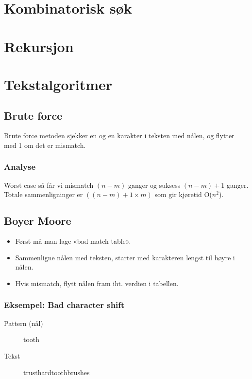 \documentclass[11pt,a4paper]{article}
\theoremstyle{def}
\begin{document}
\section{Kombinatorisk søk}
\section{Rekursjon}

\section{Tekstalgoritmer}

\subsection{Brute force}
Brute force metoden sjekker en og en karakter i teksten med nålen, og flytter med 1 om det er mismatch.

\subsubsection{Analyse}
Worst case så får vi mismatch $(n-m)$ ganger og suksess $(n-m)+1$ ganger. Totale sammenligninger er $((n-m)+1 \times m)$ som gir kjøretid O($n^2$).

\subsection{Boyer Moore}
\begin{itemize}
\item
Først må man lage «bad match table».
\item
Sammenligne nålen med teksten, starter med karakteren lengst til høyre i nålen.
\item
Hvis mismatch, flytt nålen fram iht. verdien i tabellen.
\end{itemize}

\subsubsection{Eksempel: Bad character shift}
\begin{description}
\item[Pattern (nål)] tooth
\item[Tekst] trusthardtoothbrushes
\end{description}
\end{document}
